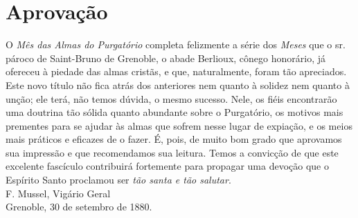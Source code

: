 \renewcommand{\thechapterdisplay}{}
\renewcommand{\thechapterrunner}{Aprovação}
\chapter{Aprovação}
O \textit{Mês das Almas do Purgatório} completa felizmente a série dos \textit{Meses} que o sr. pároco de Saint-Bruno de Grenoble, o abade Berlioux, cônego honorário, já ofereceu à piedade das almas cristãs, e que, naturalmente, foram tão apreciados. Este novo título não fica atrás dos anteriores nem quanto à solidez nem quanto à unção; ele terá, não temos dúvida, o mesmo sucesso. Nele, os fiéis encontrarão uma doutrina tão sólida quanto abundante sobre o Purgatório, os motivos mais prementes para se ajudar às almas que sofrem nesse lugar de expiação, e os meios mais práticos e eficazes de o fazer. É, pois, de muito bom grado que aprovamos sua impressão e que recomendamos sua leitura. Temos a convicção de que este excelente fascículo contribuirá fortemente para propagar uma devoção que o Espírito Santo proclamou ser \textit{tão santa e tão salutar}.
 \\

F. Mussel, Vigário Geral
 \\

Grenoble, 30 de setembro de 1880.
